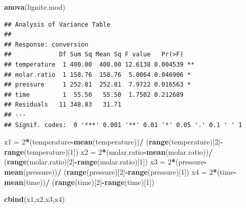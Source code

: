 \documentclass[
]{article}
\newenvironment{Shaded}{\begin{snugshade}}{\end{snugshade}}
\newcommand{\DecValTok}[1]{\textcolor[rgb]{0.00,0.00,0.81}{#1}}
\newcommand{\FunctionTok}[1]{\textcolor[rgb]{0.13,0.29,0.53}{\textbf{#1}}}
\newcommand{\NormalTok}[1]{#1}
\newcommand{\OtherTok}[1]{\textcolor[rgb]{0.56,0.35,0.01}{#1}}
\newcommand{\SpecialCharTok}[1]{\textcolor[rgb]{0.81,0.36,0.00}{\textbf{#1}}}
\begin{document}
\begin{Shaded}
\begin{Highlighting}[]
\FunctionTok{anova}\NormalTok{(lignite.mod)}
\end{Highlighting}
\end{Shaded}

\begin{verbatim}
## Analysis of Variance Table
## 
## Response: conversion
##             Df Sum Sq Mean Sq F value   Pr(>F)   
## temperature  1 400.00  400.00 12.6138 0.004539 **
## molar.ratio  1 158.76  158.76  5.0064 0.046906 * 
## pressure     1 252.81  252.81  7.9722 0.016563 * 
## time         1  55.50   55.50  1.7502 0.212689   
## Residuals   11 348.83   31.71                    
## ---
## Signif. codes:  0 '***' 0.001 '**' 0.01 '*' 0.05 '.' 0.1 ' ' 1
\end{verbatim}

\begin{Shaded}
\begin{Highlighting}[]
\NormalTok{x1 }\OtherTok{=} \DecValTok{2}\SpecialCharTok{*}\NormalTok{(temperature}\SpecialCharTok{{-}}\FunctionTok{mean}\NormalTok{(temperature))}\SpecialCharTok{/}\NormalTok{ (}\FunctionTok{range}\NormalTok{(temperature)[}\DecValTok{2}\NormalTok{]}\SpecialCharTok{{-}}\FunctionTok{range}\NormalTok{(temperature)[}\DecValTok{1}\NormalTok{])}
\NormalTok{x2 }\OtherTok{=} \DecValTok{2}\SpecialCharTok{*}\NormalTok{(molar.ratio}\SpecialCharTok{{-}}\FunctionTok{mean}\NormalTok{(molar.ratio))}\SpecialCharTok{/}\NormalTok{ (}\FunctionTok{range}\NormalTok{(molar.ratio)[}\DecValTok{2}\NormalTok{]}\SpecialCharTok{{-}}\FunctionTok{range}\NormalTok{(molar.ratio)[}\DecValTok{1}\NormalTok{])}
\NormalTok{x3 }\OtherTok{=} \DecValTok{2}\SpecialCharTok{*}\NormalTok{(pressure}\SpecialCharTok{{-}}\FunctionTok{mean}\NormalTok{(pressure))}\SpecialCharTok{/}\NormalTok{ (}\FunctionTok{range}\NormalTok{(pressure)[}\DecValTok{2}\NormalTok{]}\SpecialCharTok{{-}}\FunctionTok{range}\NormalTok{(pressure)[}\DecValTok{1}\NormalTok{])}
\NormalTok{x4 }\OtherTok{=} \DecValTok{2}\SpecialCharTok{*}\NormalTok{(time}\SpecialCharTok{{-}}\FunctionTok{mean}\NormalTok{(time))}\SpecialCharTok{/}\NormalTok{ (}\FunctionTok{range}\NormalTok{(time)[}\DecValTok{2}\NormalTok{]}\SpecialCharTok{{-}}\FunctionTok{range}\NormalTok{(time)[}\DecValTok{1}\NormalTok{])}

\FunctionTok{cbind}\NormalTok{(x1,x2,x3,x4)}
\end{Highlighting}
\end{Shaded}
\end{document}
